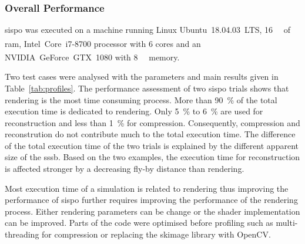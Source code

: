 \subsubsection{Overall Performance}
\gls{sispo} was executed on a machine running Linux Ubuntu~18.04.03~LTS, \SI{16}{\giga\byte} of \gls{ram}, Intel\textsuperscript{\textregistered}~Core\texttrademark~i7-8700 processor with \SI{6}{} cores and an NVIDIA\textsuperscript{\textregistered}~GeForce~GTX~1080 with \SI{8}{\giga\byte} memory.

Two test cases were analysed with the parameters and main results given in Table~\ref{tab:profiles}. The performance assessment of two \gls{sispo} trials shows that rendering is the most time consuming process. More than \SI{90}{\percent} of the total execution time is dedicated to rendering.  Only \SI{5}{\percent} to \SI{6}{\percent} are used for reconstruction and less than \SI{1}{\percent} for compression. Consequently, compression and reconstrution do not contribute much to the total execution time. The difference of the total execution time of the two trials is explained by the different apparent size of the \gls{sssb}. Based on the two examples, the execution time for reconstruction is affected stronger by a decreasing fly-by distance than rendering.

Most execution time of a simulation is related to rendering thus improving the performance of \gls{sispo} further requires improving the performance of the rendering process. Either rendering parameters can be change or the shader implementation can be improved. Parts of the code were optimised before profiling such as multi-threading for compression or replacing the \gls{skimage} library with OpenCV.

\begin{table}[htb]
    \centering
    \caption{Summary of two profiles obtained while executing complete trials of \gls{sispo}, i.e. rendering, compression and reconstruction. More than \SI{90}{\percent} of total time is spent rendering images.}
    \label{tab:profiles}
\end{table}

